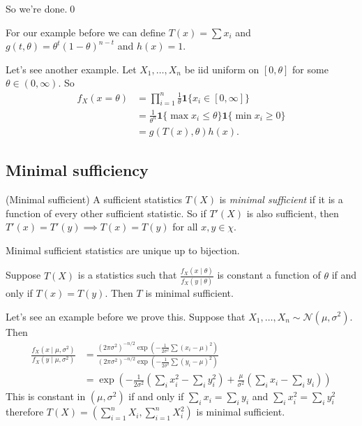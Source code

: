 \documentclass{article}
\begin{document}
So we're done.\qed
\begin{remark}
	For our example before we can define $ T(x) = \sum x_i $ and $ g(t,\theta)  = \theta^t (1-\theta)^{n-t} $ and $ h(x) = 1 $.
\end{remark}
Let's see another example. Let $ X_1,\dots,X_n $ be iid uniform on $ [0,\theta] $ for some $ \theta\in (0,\infty) $. So
\begin{align*}
	f_X(x=\theta)&=\prod_{i=1}^n \frac 1\theta \mathbf 1\{x_i\in [0,\infty]\}\\
		     &=\frac 1{\theta^n} \mathbf 1\{\max x_i\le \theta\}\mathbf 1\{\min x_i\ge 0 \}\\
		     &= g(T(x),\theta)h(x).
\end{align*}
\subsection{Minimal sufficiency} 
\begin{definition}
	(Minimal sufficient) A sufficient statistics $ T(X) $ is \textit{minimal sufficient} if it is a function of every other sufficient statistic. So if $ T'(X) $ is also sufficient, then $ T'(x)=T'(y)\implies T(x)=T(y) $ for all $ x,y\in \chi $.
\end{definition}
\begin{remark}
  Minimal sufficient statistics are unique up to bijection. 
\end{remark}
\begin{theorem}
	Suppose $ T(X) $ is a statistics such that $ \frac{f_X(x\mid \theta)}{f_X(y\mid \theta)} $ is constant a function of $ \theta $ if and only if $ T(x)=T(y) $. Then $ T $ is minimal sufficient.
\end{theorem}
Let's see an example before we prove this. Suppose that $ X_1,\dots, X_n\sim\mathcal N(\mu,\sigma^2) $. Then
\begin{align*}
	\frac{f_X(x\mid \mu,\sigma^2)}{f_X(y\mid \mu,\sigma^2)} &=\frac{(2\pi \sigma^2)^{-n/2}\exp\left(-\frac 1{2\sigma^2}\sum(x_i-\mu)^2\right)}{(2\pi \sigma^2)^{-n/2}\exp\left(-\frac 1{2\sigma^2}\sum(y_i-\mu)^2\right)}\\
								&=\exp\left(-\frac{1}{2\sigma^2}\left(\sum_i x_i^2 - \sum_i y_i^2\right)+\frac \mu{\sigma^2}\left(\sum_i x_i-\sum_i y_i\right)\right)
\end{align*}
This is constant in $ (\mu,\sigma^2) $ if and only if $ \sum_i x_i=\sum_i y_i $ and $ \sum_i x_i^2 = \sum_i y_i^2 $ therefore $ T(X)=\left(\sum_{i=1}^n X_i,\sum_{i=1}^n X_i^2\right) $ is minimal sufficient.
\end{document}
